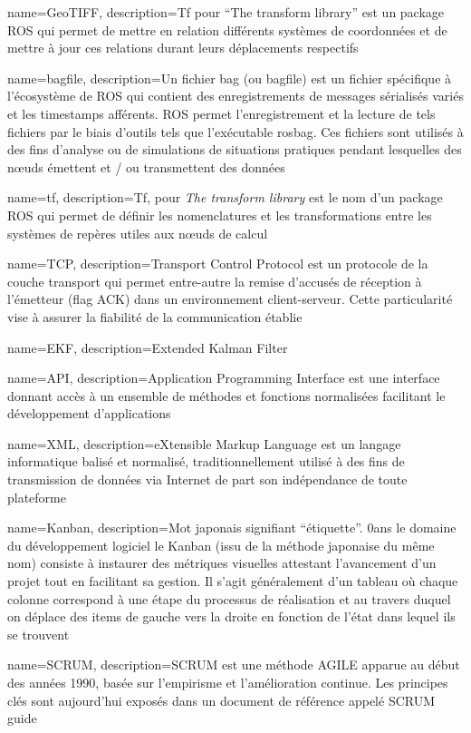 {
  name={GeoTIFF},
    description={Tf pour ``The transform library'' est un package ROS qui permet de mettre en relation différents systèmes de coordonnées et de mettre à jour ces relations durant leurs déplacements respectifs}
}

{
  name={bagfile},
    description={Un fichier bag (ou bagfile) est un fichier spécifique à l'écosystème de ROS qui contient des enregistrements de messages sérialisés variés et les timestamps afférents. 
    ROS permet l'enregistrement et la lecture de tels fichiers par le biais d'outils tels que l'exécutable rosbag.
    Ces fichiers sont utilisés à des fins d'analyse ou de simulations de situations pratiques pendant lesquelles des n\oe{}uds émettent et / ou transmettent des données}
}

{
  name={tf},
    description={Tf, pour \emph{The transform library} est le nom d'un package ROS qui permet de définir les nomenclatures et les transformations entre les systèmes de repères utiles aux n\oe{}uds de calcul}
}

{
  name={TCP},
    description={Transport Control Protocol est un protocole de la couche transport qui permet entre-autre la remise d'accusés de réception à l'émetteur (flag ACK) dans un environnement client-serveur. 
    Cette particularité vise à assurer la fiabilité de la communication établie}
}

{
  name={EKF},
    description={Extended Kalman Filter}
}

{
  name={API},
    description={Application Programming Interface est une interface donnant accès à un ensemble de méthodes et fonctions normalisées facilitant le développement d'applications}
}

{
  name={XML},
    description={eXtensible Markup Language est un langage informatique balisé et normalisé, traditionnellement utilisé à des fins de transmission de données via Internet de part son indépendance de toute plateforme}
}

{
  name={Kanban},
    description={Mot japonais signifiant  ``étiquette''. 0ans le domaine du développement logiciel le Kanban (issu de la méthode japonaise du même nom) consiste à instaurer des métriques visuelles attestant l'avancement d'un projet tout en facilitant sa gestion. 
    Il s'agit généralement d'un tableau où chaque colonne correspond à une étape du processus de réalisation et au travers duquel on déplace des items de gauche vers la droite en fonction de l'état dans lequel ils se trouvent}
}

{
  name={SCRUM},
    description={SCRUM est une méthode AGILE apparue au début des années 1990, basée sur l'empirisme et l'amélioration continue. Les principes clés sont aujourd'hui exposés dans un document de référence appelé SCRUM guide}
}